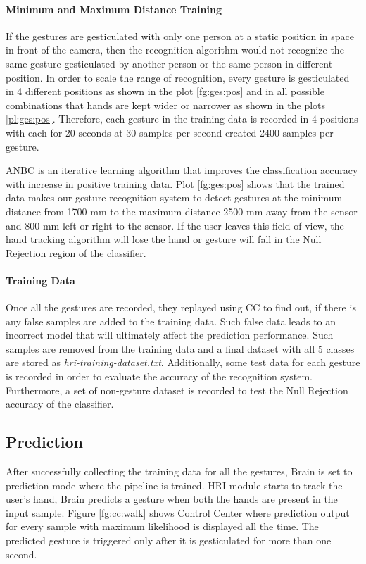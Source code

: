 

\paragraph*{Minimum and Maximum Distance Training} \label{sec:range:train} If the gestures are gesticulated with only one person at a static position in space in front of the camera, then the recognition algorithm would not recognize the same gesture gesticulated by another person or the same person in different position. In order to scale the range of recognition, every gesture is gesticulated in 4 different positions as shown in the plot \ref{fg:ges:pos} and in all possible combinations that hands are kept wider or narrower as shown in the plots \ref{pl:ges:pos}. Therefore, each gesture in the training data is recorded in 4 positions with each for 20 seconds at 30 samples per second created 2400 samples per gesture. 

ANBC is an iterative learning algorithm that improves the classification accuracy with increase in positive training data. Plot \ref{fg:ges:pos} shows that the trained data makes our gesture recognition system to detect gestures at the minimum distance from 1700 mm to the maximum distance 2500 mm away from the sensor and 800 mm left or right to the sensor. If the user leaves this field of view, the hand tracking algorithm will lose the hand or gesture will fall in the Null Rejection region of the classifier.



\paragraph*{Training Data} Once all the gestures are recorded, they replayed using CC to find out, if there is any false samples are added to the training data. Such false data leads to an incorrect model that will ultimately affect the prediction performance. Such samples are removed from the training data and a final dataset with all 5 classes are stored as \textit{hri-training-dataset.txt}. Additionally, some test data for each gesture is recorded in order to evaluate the accuracy of the recognition system. Furthermore, a set of non-gesture dataset is recorded to test the Null Rejection accuracy of the classifier. 

\subsection{Prediction} After successfully collecting the training data for all the gestures, Brain is set to prediction mode where the pipeline is trained. HRI module starts to track the user's hand, Brain predicts a gesture when both the hands are present in the input sample. Figure \ref{fg:cc:walk} shows Control Center where prediction output for every sample with maximum likelihood is displayed all the time. The predicted gesture is triggered only after it is gesticulated for more than one second.

 
